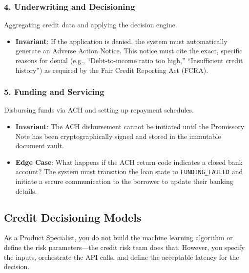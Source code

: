 \documentclass[
  11pt,
  openany,
  oneside]{book}
\providecommand{\tightlist}{%
  \setlength{\itemsep}{0pt}\setlength{\parskip}{0pt}}
\begin{document}
\subsubsection{4. Underwriting and
Decisioning}\label{underwriting-and-decisioning}

Aggregating credit data and applying the decision engine.

\begin{itemize}
\tightlist
\item
  \textbf{Invariant}: If the application is denied, the system must
  automatically generate an Adverse Action Notice. This notice must cite
  the exact, specific reasons for denial (e.g., ``Debt-to-income ratio
  too high,'' ``Insufficient credit history'') as required by the Fair
  Credit Reporting Act (FCRA).
\end{itemize}

\subsubsection{5. Funding and Servicing}\label{funding-and-servicing}

Disbursing funds via ACH and setting up repayment schedules.

\begin{itemize}
\tightlist
\item
  \textbf{Invariant}: The ACH disbursement cannot be initiated until the
  Promissory Note has been cryptographically signed and stored in the
  immutable document vault.
\item
  \textbf{Edge Case}: What happens if the ACH return code indicates a
  closed bank account? The system must transition the loan state to
  \texttt{FUNDING\_FAILED} and initiate a secure communication to the
  borrower to update their banking details.
\end{itemize}

\subsection{Credit Decisioning Models}\label{credit-decisioning-models}

As a Product Specialist, you do not build the machine learning algorithm
or define the risk parameters---the credit risk team does that. However,
you specify the inputs, orchestrate the API calls, and define the
acceptable latency for the decision.
\end{document}
